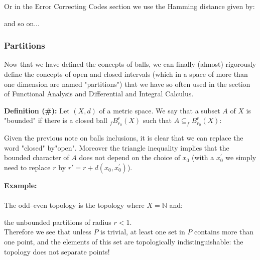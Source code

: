 	
	Or in the Error Correcting Codes section we use the Hamming distance given by:
	
	and so on...
	
	\subsubsection{Partitions}
	Now that we have defined the concepts of balls, we can finally (almost) rigorously define the concepts of open and closed intervals (which in a space of more than one dimension are named "partitions") that we have so often used in the section of Functional Analysis and Differential and Integral Calculus.
	
	\textbf{Definition (\#\mydef):} Let $(X,d)$ of a metric space. We say that a subset $A$ of $X$ is "bounded" if there is a closed ball $_fB_{r_0}^r(X)$ such that $A \subseteq _fB_{r_0}^r(X)$:
	
	Given the previous note on balls inclusions, it is clear that we can replace the word "closed" by"open". Moreover the triangle inequality implies that the bounded character of $A$ does not depend on the choice of $x_0$ (with a $x_0^{\prime}$ we simply need to replace $r$ by $r'=r+d\left(x_0,x_0^{\prime}\right)$).
	\begin{tcolorbox}[colframe=black,colback=white,sharp corners]
	\textbf{{\Large {}}Example:}\\\\
	The odd–even topology is the topology where $X = \mathbb{N}$ and:
	
	the unbounded partitions of radius $r<1$. \\
	
	 Therefore we see that unless $P$ is trivial, at least one set in $P$ contains more than one point, and the elements of this set are topologically indistinguishable: the topology does not separate points!
	\end{tcolorbox}
	
